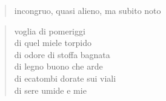 \begin{verse}
    incongruo, quasi alieno, ma subito noto
\end{verse}

\clearpage


\begin{verse}
    voglia di pomeriggi\\
    di quel miele torpido\\
    di odore di stoffa bagnata\\
    di legno buono che arde\\
    di ecatombi dorate sui viali\\
    di sere umide e mie
\end{verse}
